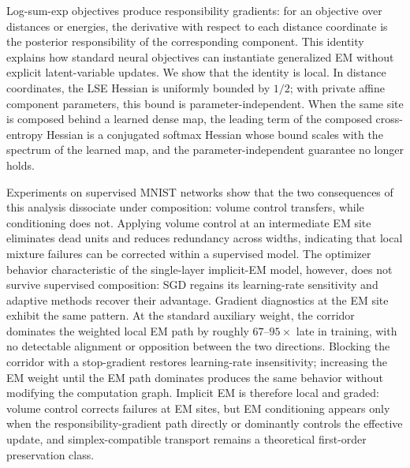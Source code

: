 Log-sum-exp objectives produce responsibility gradients: for an objective over
distances or energies, the derivative with respect to each distance coordinate
is the posterior responsibility of the corresponding component. This identity
explains how standard neural objectives can instantiate generalized EM without
explicit latent-variable updates. We show that the identity is local. In
distance coordinates, the LSE Hessian is uniformly bounded by $1/2$; with
private affine component parameters, this bound is parameter-independent. When
the same site is composed behind a learned dense map, the leading term of the
composed cross-entropy Hessian is a conjugated softmax Hessian whose bound
scales with the spectrum of the learned map, and the parameter-independent
guarantee no longer holds.

Experiments on supervised MNIST networks show that the two consequences of this
analysis dissociate under composition: volume control transfers, while
conditioning does not. Applying volume control at an intermediate EM site
eliminates dead units and reduces redundancy across widths, indicating that
local mixture failures can be corrected within a supervised model. The
optimizer behavior characteristic of the single-layer implicit-EM model,
however, does not survive supervised composition: SGD regains its
learning-rate sensitivity and adaptive methods recover their advantage.
Gradient diagnostics at the EM site exhibit the same pattern. At the standard
auxiliary weight, the corridor dominates the weighted local EM path
by roughly $67$--$95\times$ late in training, with no detectable alignment or
opposition between the two directions. Blocking the corridor with a
stop-gradient restores learning-rate insensitivity; increasing the EM weight
until the EM path dominates produces the same behavior without modifying the
computation graph. Implicit EM is therefore local and graded: volume control
corrects failures at EM sites, but EM conditioning appears only when the
responsibility-gradient path directly or dominantly controls the effective
update, and simplex-compatible transport remains a theoretical first-order
preservation class.